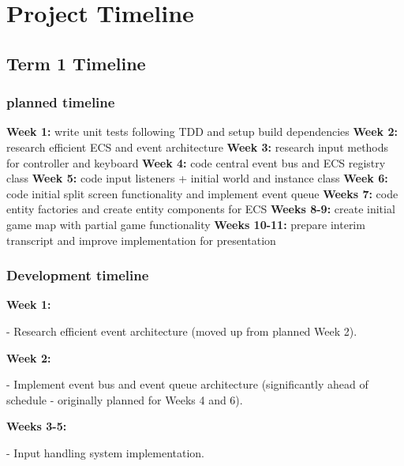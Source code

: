 \documentclass[]{final_report}
\begin{document}
\chapter{Project Timeline}
\section{Term 1 Timeline}
\subsection{planned timeline}
\textbf{Week 1:} write unit tests following TDD and setup build dependencies \newline
\textbf{Week 2:} research efficient ECS and event architecture \newline
\textbf{Week 3:} research input methods for controller and keyboard \newline
\textbf{Week 4:} code central event bus and ECS registry class \newline
\textbf{Week 5:} code input listeners + initial world and instance class \newline
\textbf{Week 6:} code initial split screen functionality and implement event queue \newline
\textbf{Weeks 7:} code entity factories and create entity components for ECS \newline
\textbf{Weeks 8-9:} create initial game map with partial game functionality \newline
\textbf{Weeks 10-11:} prepare interim transcript and improve implementation for presentation \newline
\subsection{Development timeline}
\textbf{Week 1:} \newline

 - Research efficient event architecture (moved up from planned Week 2). \newline

\textbf{Week 2:} \newline

 - Implement event bus and event queue architecture (significantly ahead of schedule - originally planned for Weeks 4 and 6). \newline

\textbf{Weeks 3-5:} \newline

 - Input handling system implementation. \newline
\end{document}

